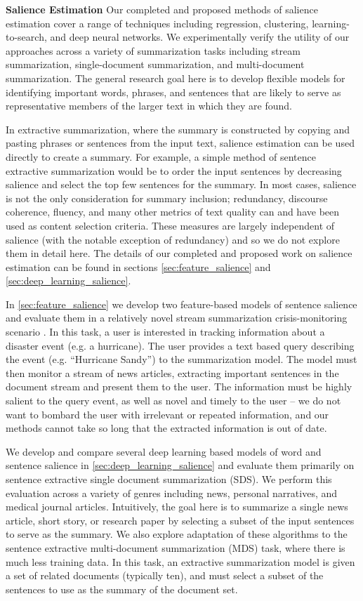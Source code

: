 \textbf{Salience Estimation} Our completed and proposed methods of salience estimation cover a range of
techniques including regression, clustering, learning-to-search,
and deep neural networks. 
We experimentally verify the utility of our approaches
across a variety of summarization tasks including stream summarization,
single-document summarization, and multi-document summarization.
The general research goal here is to develop flexible models for 
identifying
important words, phrases, and sentences that are likely to serve as 
representative members of the larger text in which they are found.

In extractive summarization, 
where the summary is constructed by copying and pasting phrases or sentences 
from the input text, salience estimation can be used directly to create
a summary. For example, a simple method of sentence extractive summarization
would be to order the input sentences by decreasing salience and select the
top few sentences for the summary. In most cases, salience is not the only
consideration for summary inclusion; redundancy, discourse coherence, fluency,
and many other metrics of text quality can and have been used as content
selection criteria. These measures are largely independent of salience 
(with the notable exception of redundancy) and so we do not explore them in 
detail here. The details of our completed and proposed work on 
salience estimation can be found
in sections \ref{sec:feature_salience} and \ref{sec:deep_learning_salience}.

In \autoref{sec:feature_salience} we develop two feature-based models of 
sentence
salience and evaluate them in a relatively novel stream 
summarization crisis-monitoring scenario
\cite{starbird2013working,aslam2015trec,aslam2016trec}. In this task, a user is interested
in tracking information about a disaster event (e.g. a hurricane). The
user provides a text based query describing the event 
(e.g. ``Hurricane Sandy'') to the summarization model. 
The model must then 
monitor a stream of news articles, extracting important sentences in the 
document stream and present them to the user. The information must be 
highly salient to the query event, as well as novel and timely to the user 
-- we do not want to bombard the user with irrelevant or repeated information,
and our methods cannot take so long  that the extracted
information is out of date.
  
We develop and compare several deep learning based models of word and 
sentence salience in \autoref{sec:deep_learning_salience} and evaluate them 
primarily on
sentence extractive single document summarization (SDS). 
We perform this evaluation across
a variety of genres including news, personal narratives, and medical journal
articles. Intuitively, the goal here is to summarize a single news article, 
short story, or research paper by selecting a subset of the input sentences
to serve as the summary. We also explore adaptation of these algorithms to 
the sentence extractive multi-document summarization (MDS) task, 
where there is much less training data.
In this task, an extractive summarization model is given a set of related 
documents 
(typically ten), and must select a subset of the sentences to use as the summary of
the document set.


